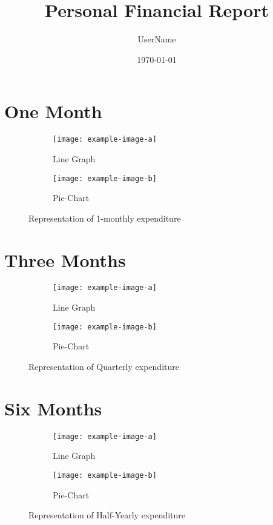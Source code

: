 \documentclass{article}
\begin{document}
\title{Personal Financial Report}
\author{UserName}
\date{\today}
\maketitle

\section{One Month}
\begin{figure}[htbp]
    \centering
    \begin{subfigure}{0.45\textwidth}
        \texttt{[image: example-image-a]}
        \caption{Line Graph}
    \end{subfigure}
    \hfill
    \begin{subfigure}{0.45\textwidth}
        \texttt{[image: example-image-b]}
        \caption{Pie-Chart}
    \end{subfigure}
    \caption{Representation of 1-monthly expenditure}
\end{figure}

\section{Three Months}
\begin{figure}[htbp]
    \centering
    \begin{subfigure}{0.45\textwidth}
        \texttt{[image: example-image-a]}
        \caption{Line Graph}
    \end{subfigure}
    \hfill
    \begin{subfigure}{0.45\textwidth}
        \texttt{[image: example-image-b]}
        \caption{Pie-Chart}
    \end{subfigure}
    \caption{Representation of Quarterly expenditure}
\end{figure}

\section{Six Months}
\begin{figure}[htbp]
    \centering
    \begin{subfigure}{0.45\textwidth}
        \texttt{[image: example-image-a]}
        \caption{Line Graph}
    \end{subfigure}
    \hfill
    \begin{subfigure}{0.45\textwidth}
        \texttt{[image: example-image-b]}
        \caption{Pie-Chart}
    \end{subfigure}
    \caption{Representation of Half-Yearly expenditure}
\end{figure}
\end{document}
